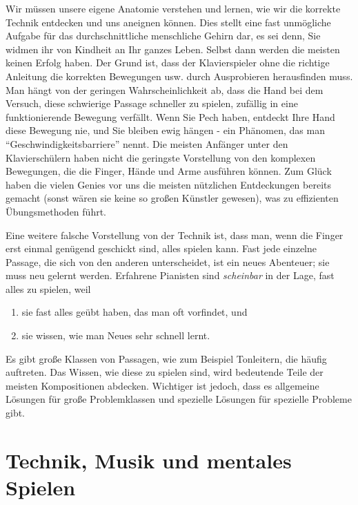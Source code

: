 Wir müssen unsere eigene Anatomie verstehen und lernen, wie wir die korrekte Technik entdecken und uns aneignen können.
Dies stellt eine fast unmögliche Aufgabe für das durchschnittliche menschliche Gehirn dar, es sei denn, Sie widmen ihr von Kindheit an Ihr ganzes Leben.
Selbst dann werden die meisten keinen Erfolg haben.
Der Grund ist, dass der Klavierspieler ohne die richtige Anleitung die korrekten Bewegungen usw. durch Ausprobieren herausfinden muss.
Man hängt von der geringen Wahrscheinlichkeit ab, dass die Hand bei dem Versuch, diese schwierige Passage schneller zu spielen, zufällig in eine funktionierende Bewegung verfällt.
Wenn Sie Pech haben, entdeckt Ihre Hand diese Bewegung nie, und Sie bleiben ewig hängen - ein Phänomen, das man \enquote{Geschwindigkeitsbarriere} nennt.
Die meisten Anfänger unter den Klavierschülern haben nicht die geringste Vorstellung von den komplexen Bewegungen, die die Finger, Hände und Arme ausführen können.
Zum Glück haben die vielen Genies vor uns die meisten nützlichen Entdeckungen bereits gemacht (sonst wären sie keine so großen Künstler gewesen), was zu effizienten Übungsmethoden führt.

Eine weitere falsche Vorstellung von der Technik ist, dass man, wenn die Finger erst einmal genügend geschickt sind, alles spielen kann.
Fast jede einzelne Passage, die sich von den anderen unterscheidet, ist ein neues Abenteuer; sie muss neu gelernt werden.
Erfahrene Pianisten sind \textit{scheinbar} in der Lage, fast alles zu spielen, weil

\begin{enumerate}[label={\arabic*.}] 
\item sie fast alles geübt haben, das man oft vorfindet, und
\item sie wissen, wie man Neues sehr schnell lernt.
 \end{enumerate}
Es gibt große Klassen von Passagen, wie zum Beispiel Tonleitern, die häufig auftreten.
Das Wissen, wie diese zu spielen sind, wird bedeutende Teile der meisten Kompositionen abdecken.
Wichtiger ist jedoch, dass es allgemeine Lösungen für große Problemklassen und spezielle Lösungen für spezielle Probleme gibt.


\section{Technik, Musik und mentales Spielen}\hypertarget{c1i3}{}

